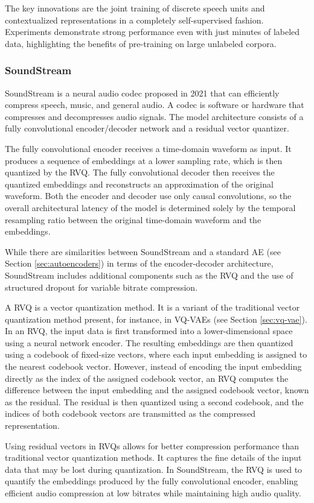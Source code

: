 The key innovations are the joint training of discrete speech units and contextualized representations in a completely self-supervised fashion. Experiments demonstrate strong performance even with just minutes of labeled data, highlighting the benefits of pre-training on large unlabeled corpora.

\subsubsection{SoundStream} \label{sec:soundstream}

SoundStream is a neural audio codec proposed in 2021 \cite{zeghidour_soundstream_2021} that can efficiently compress speech, music, and general audio. A codec is software or hardware that compresses and decompresses audio signals. The model architecture consists of a fully convolutional encoder/decoder network and a residual vector quantizer.

The fully convolutional encoder receives a time-domain waveform as input. It produces a sequence of embeddings at a lower sampling rate, which is then quantized by the \ac{RVQ}. The fully convolutional decoder then receives the quantized embeddings and reconstructs an approximation of the original waveform. Both the encoder and decoder use only causal convolutions, so the overall architectural latency of the model is determined solely by the temporal resampling ratio between the original time-domain waveform and the embeddings.

While there are similarities between SoundStream and a standard \ac{AE} (see Section \ref{sec:autoencoders}) in terms of the encoder-decoder architecture, SoundStream includes additional components such as the \ac{RVQ} and the use of structured dropout for variable bitrate compression.

A \acf{RVQ} is a vector quantization method. It is a variant of the traditional vector quantization method present, for instance, in \acp{VQ-VAE} (see Section \ref{sec:vq-vae}). In an \ac{RVQ}, the input data is first transformed into a lower-dimensional space using a neural network encoder. The resulting embeddings are then quantized using a codebook of fixed-size vectors, where each input embedding is assigned to the nearest codebook vector. However, instead of encoding the input embedding directly as the index of the assigned codebook vector, an \ac{RVQ} computes the difference between the input embedding and the assigned codebook vector, known as the residual. The residual is then quantized using a second codebook, and the indices of both codebook vectors are transmitted as the compressed representation.

Using residual vectors in \acp{RVQ} allows for better compression performance than traditional vector quantization methods. It captures the fine details of the input data that may be lost during quantization. In SoundStream, the \ac{RVQ} is used to quantify the embeddings produced by the fully convolutional encoder, enabling efficient audio compression at low bitrates while maintaining high audio quality.